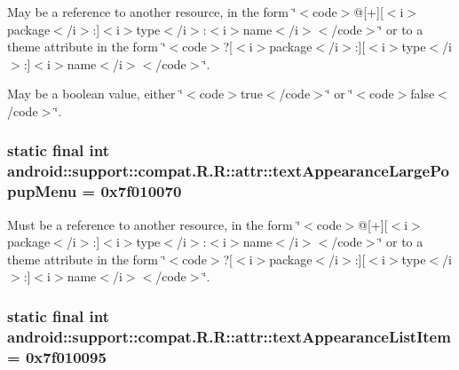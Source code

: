 May be a reference to another resource, in the form \char`\"{}$<$code$>$@\mbox{[}+\mbox{]}\mbox{[}$<$i$>$package$<$/i$>$:\mbox{]}$<$i$>$type$<$/i$>$:$<$i$>$name$<$/i$>$$<$/code$>$\char`\"{} or to a theme attribute in the form \char`\"{}$<$code$>$?\mbox{[}$<$i$>$package$<$/i$>$:\mbox{]}\mbox{[}$<$i$>$type$<$/i$>$:\mbox{]}$<$i$>$name$<$/i$>$$<$/code$>$\char`\"{}. 

May be a boolean value, either \char`\"{}$<$code$>$true$<$/code$>$\char`\"{} or \char`\"{}$<$code$>$false$<$/code$>$\char`\"{}. \hypertarget{classandroid_1_1support_1_1compat_1_1_r_1_1attr_68d114f958062bb61877cf72554c706d}{
\subsubsection[{textAppearanceLargePopupMenu}]{\setlength{\rightskip}{0pt plus 5cm}static final int android::support::compat.R.R::attr::textAppearanceLargePopupMenu = 0x7f010070}}
\label{classandroid_1_1support_1_1compat_1_1_r_1_1attr_68d114f958062bb61877cf72554c706d}


Must be a reference to another resource, in the form \char`\"{}$<$code$>$@\mbox{[}+\mbox{]}\mbox{[}$<$i$>$package$<$/i$>$:\mbox{]}$<$i$>$type$<$/i$>$:$<$i$>$name$<$/i$>$$<$/code$>$\char`\"{} or to a theme attribute in the form \char`\"{}$<$code$>$?\mbox{[}$<$i$>$package$<$/i$>$:\mbox{]}\mbox{[}$<$i$>$type$<$/i$>$:\mbox{]}$<$i$>$name$<$/i$>$$<$/code$>$\char`\"{}. \hypertarget{classandroid_1_1support_1_1compat_1_1_r_1_1attr_5c0a4fdf8c477781d281c98c63606145}{
\subsubsection[{textAppearanceListItem}]{\setlength{\rightskip}{0pt plus 5cm}static final int android::support::compat.R.R::attr::textAppearanceListItem = 0x7f010095}}
\label{classandroid_1_1support_1_1compat_1_1_r_1_1attr_5c0a4fdf8c477781d281c98c63606145}


